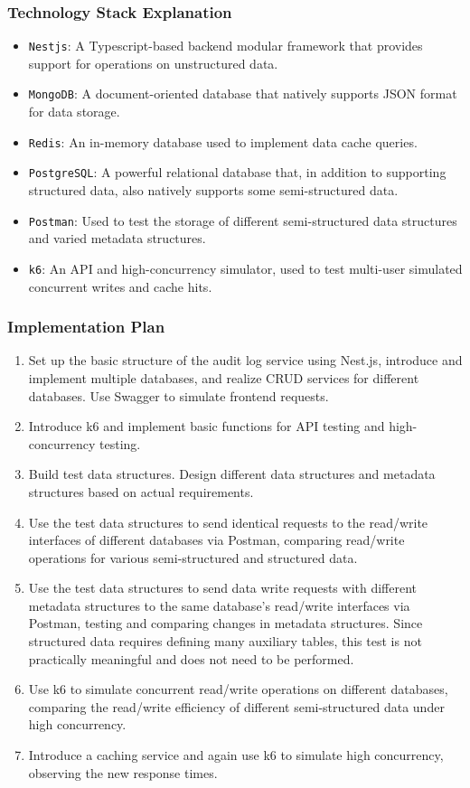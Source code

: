 \documentclass{article}
\begin{document}
\subsubsection{Technology Stack Explanation}
\begin{itemize}
    \item \texttt{Nestjs}: A Typescript-based backend modular framework that provides support for operations on unstructured data.
    \item \texttt{MongoDB}: A document-oriented database that natively supports JSON format for data storage.
    \item \texttt{Redis}: An in-memory database used to implement data cache queries.
    \item \texttt{PostgreSQL}: A powerful relational database that, in addition to supporting structured data, also natively supports some semi-structured data.
    \item \texttt{Postman}: Used to test the storage of different semi-structured data structures and varied metadata structures.
    \item \texttt{k6}: An API and high-concurrency simulator, used to test multi-user simulated concurrent writes and cache hits.
\end{itemize}

\subsubsection{Implementation Plan}

\begin{enumerate}
    \item Set up the basic structure of the audit log service using Nest.js, introduce and implement multiple databases, and realize CRUD services for different databases. Use Swagger to simulate frontend requests.
    \item Introduce k6 and implement basic functions for API testing and high-concurrency testing.
    \item Build test data structures. Design different data structures and metadata structures based on actual requirements.
    \item Use the test data structures to send identical requests to the read/write interfaces of different databases via Postman, comparing read/write operations for various semi-structured and structured data.
    \item Use the test data structures to send data write requests with different metadata structures to the same database's read/write interfaces via Postman, testing and comparing changes in metadata structures. Since structured data requires defining many auxiliary tables, this test is not practically meaningful and does not need to be performed.
    \item Use k6 to simulate concurrent read/write operations on different databases, comparing the read/write efficiency of different semi-structured data under high concurrency.
    \item Introduce a caching service and again use k6 to simulate high concurrency, observing the new response times.
\end{enumerate}
\end{document}
